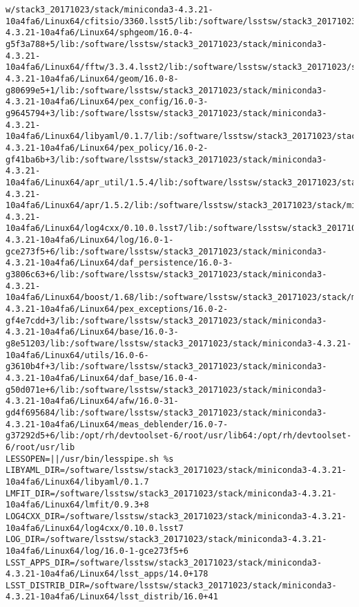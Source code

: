 \begin{verbatim}
w/stack3_20171023/stack/miniconda3-4.3.21-10a4fa6/Linux64/cfitsio/3360.lsst5/lib:/software/lsstsw/stack3_20171023/stack/miniconda3-4.3.21-10a4fa6/Linux64/sphgeom/16.0-4-g5f3a788+5/lib:/software/lsstsw/stack3_20171023/stack/miniconda3-4.3.21-10a4fa6/Linux64/fftw/3.3.4.lsst2/lib:/software/lsstsw/stack3_20171023/stack/miniconda3-4.3.21-10a4fa6/Linux64/geom/16.0-8-g80699e5+1/lib:/software/lsstsw/stack3_20171023/stack/miniconda3-4.3.21-10a4fa6/Linux64/pex_config/16.0-3-g9645794+3/lib:/software/lsstsw/stack3_20171023/stack/miniconda3-4.3.21-10a4fa6/Linux64/libyaml/0.1.7/lib:/software/lsstsw/stack3_20171023/stack/miniconda3-4.3.21-10a4fa6/Linux64/pex_policy/16.0-2-gf41ba6b+3/lib:/software/lsstsw/stack3_20171023/stack/miniconda3-4.3.21-10a4fa6/Linux64/apr_util/1.5.4/lib:/software/lsstsw/stack3_20171023/stack/miniconda3-4.3.21-10a4fa6/Linux64/apr/1.5.2/lib:/software/lsstsw/stack3_20171023/stack/miniconda3-4.3.21-10a4fa6/Linux64/log4cxx/0.10.0.lsst7/lib:/software/lsstsw/stack3_20171023/stack/miniconda3-4.3.21-10a4fa6/Linux64/log/16.0-1-gce273f5+6/lib:/software/lsstsw/stack3_20171023/stack/miniconda3-4.3.21-10a4fa6/Linux64/daf_persistence/16.0-3-g3806c63+6/lib:/software/lsstsw/stack3_20171023/stack/miniconda3-4.3.21-10a4fa6/Linux64/boost/1.68/lib:/software/lsstsw/stack3_20171023/stack/miniconda3-4.3.21-10a4fa6/Linux64/pex_exceptions/16.0-2-gf4e7cdd+3/lib:/software/lsstsw/stack3_20171023/stack/miniconda3-4.3.21-10a4fa6/Linux64/base/16.0-3-g8e51203/lib:/software/lsstsw/stack3_20171023/stack/miniconda3-4.3.21-10a4fa6/Linux64/utils/16.0-6-g3610b4f+3/lib:/software/lsstsw/stack3_20171023/stack/miniconda3-4.3.21-10a4fa6/Linux64/daf_base/16.0-4-g50d071e+6/lib:/software/lsstsw/stack3_20171023/stack/miniconda3-4.3.21-10a4fa6/Linux64/afw/16.0-31-gd4f695684/lib:/software/lsstsw/stack3_20171023/stack/miniconda3-4.3.21-10a4fa6/Linux64/meas_deblender/16.0-7-g37292d5+6/lib:/opt/rh/devtoolset-6/root/usr/lib64:/opt/rh/devtoolset-6/root/usr/lib
LESSOPEN=||/usr/bin/lesspipe.sh %s
LIBYAML_DIR=/software/lsstsw/stack3_20171023/stack/miniconda3-4.3.21-10a4fa6/Linux64/libyaml/0.1.7
LMFIT_DIR=/software/lsstsw/stack3_20171023/stack/miniconda3-4.3.21-10a4fa6/Linux64/lmfit/0.9.3+8
LOG4CXX_DIR=/software/lsstsw/stack3_20171023/stack/miniconda3-4.3.21-10a4fa6/Linux64/log4cxx/0.10.0.lsst7
LOG_DIR=/software/lsstsw/stack3_20171023/stack/miniconda3-4.3.21-10a4fa6/Linux64/log/16.0-1-gce273f5+6
LSST_APPS_DIR=/software/lsstsw/stack3_20171023/stack/miniconda3-4.3.21-10a4fa6/Linux64/lsst_apps/14.0+178
LSST_DISTRIB_DIR=/software/lsstsw/stack3_20171023/stack/miniconda3-4.3.21-10a4fa6/Linux64/lsst_distrib/16.0+41

\end{verbatim}
